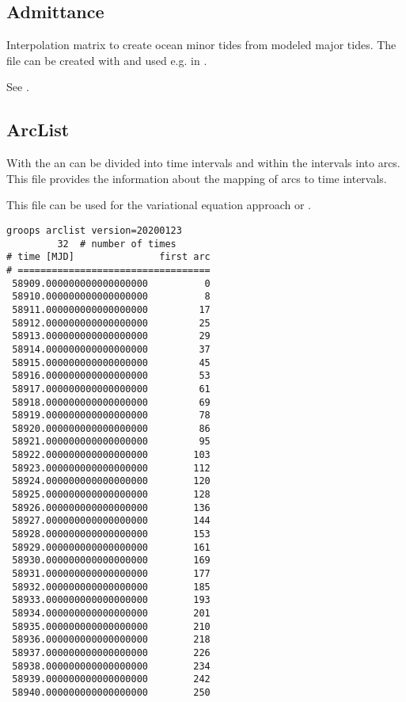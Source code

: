 \subsection{Admittance}\label{general.fileFormat:admittance}
Interpolation matrix to create ocean minor tides from modeled major tides.
The file can be created with  and used e.g. in
.

See .


\subsection{ArcList}\label{general.fileFormat:arcList}
With the  an  can
be divided into time intervals and within the intervals into arcs.
This file provides the information about the mapping of arcs to time intervals.

This file can be used for the variational equation approach or .

\begin{verbatim}
groops arclist version=20200123
         32  # number of times
# time [MJD]               first arc
# ==================================
 58909.000000000000000000          0
 58910.000000000000000000          8
 58911.000000000000000000         17
 58912.000000000000000000         25
 58913.000000000000000000         29
 58914.000000000000000000         37
 58915.000000000000000000         45
 58916.000000000000000000         53
 58917.000000000000000000         61
 58918.000000000000000000         69
 58919.000000000000000000         78
 58920.000000000000000000         86
 58921.000000000000000000         95
 58922.000000000000000000        103
 58923.000000000000000000        112
 58924.000000000000000000        120
 58925.000000000000000000        128
 58926.000000000000000000        136
 58927.000000000000000000        144
 58928.000000000000000000        153
 58929.000000000000000000        161
 58930.000000000000000000        169
 58931.000000000000000000        177
 58932.000000000000000000        185
 58933.000000000000000000        193
 58934.000000000000000000        201
 58935.000000000000000000        210
 58936.000000000000000000        218
 58937.000000000000000000        226
 58938.000000000000000000        234
 58939.000000000000000000        242
 58940.000000000000000000        250
\end{verbatim}


